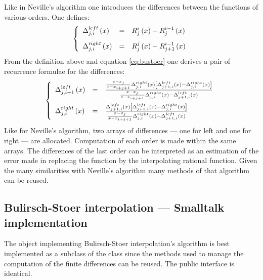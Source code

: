Like in Neville's algorithm one introduces the differences between
the functions of various orders. One defines:
\begin{equation}
\left\{
\begin{array}{lcl}
    \Delta_{j,i}^{\mathop{\textrm
left}}\left(x\right) & = & R_j^i\left(x\right) -
R_j^{i-1}\left(x\right)\\*[2ex]
    \Delta_{j,i}^{\mathop{\textrm
right}}\left(x\right) & = & R_j^j\left(x\right) -
R_{j+1}^{i-1}\left(x\right)
  \end{array}\right.
\end{equation}
From the definition above and equation \ref{eq:bustoer} one
derives a pair of recurrence formulae for the differences:
\begin{equation}
\left\{
\begin{array}{lcl}
    \Delta_{j,i+1}^{\mathop{\textrm
left}}\left(x\right) & = &{{x-x_j \over x - x_{i+j+1}}
\Delta_{j,i}^{\mathop{\textrm right}}\left(x\right)
\left[\Delta_{j+1,i}^{\mathop{\textrm left}}\left(x\right) -
\Delta_{j,i}^{\mathop{\textrm right}}\left(x\right)\right] \over
{x-x_j \over x-x_{i+j+1}} \Delta_{j,i}^{\mathop{\textrm
right}}\left(x\right) - \Delta_{j+1,i}^{\mathop{\textrm
left}}\left(x\right)}
\\*[3ex]
    \Delta_{j,i}^{\mathop{\textrm
right}}\left(x\right) & = &{ \Delta_{j+1,i}^{\mathop{\textrm
left}}\left(x\right) \left[\Delta_{j+1,i}^{\mathop{\textrm
left}}\left(x\right) - \Delta_{j,i}^{\mathop{\textrm
right}}\left(x\right)\right] \over {x-x_j \over x-x_{i+j+1}}
\Delta_{j,i}^{\mathop{\textrm right}}\left(x\right) -
\Delta_{j+1,i}^{\mathop{\textrm left}}\left(x\right)}
  \end{array}\right.
\end{equation}
Like for Neville's algorithm, two arrays of differences --- one
for left and one for right --- are allocated. Computation of each
order is made within the same arrays. The differences of the last
order can be interpreted as an estimation of the error made in
replacing the function by the interpolating rational function.
Given the many similarities with Neville's algorithm many methods
of that algorithm can be reused.

\subsection{Bulirsch-Stoer interpolation --- Smalltalk implementation}

The object implementing Bulirsch-Stoer interpolation's algorithm is best implemented as a
subclass of the class  since the
methods used to manage the computation of the finite differences
can be reused. The public interface is identical.

